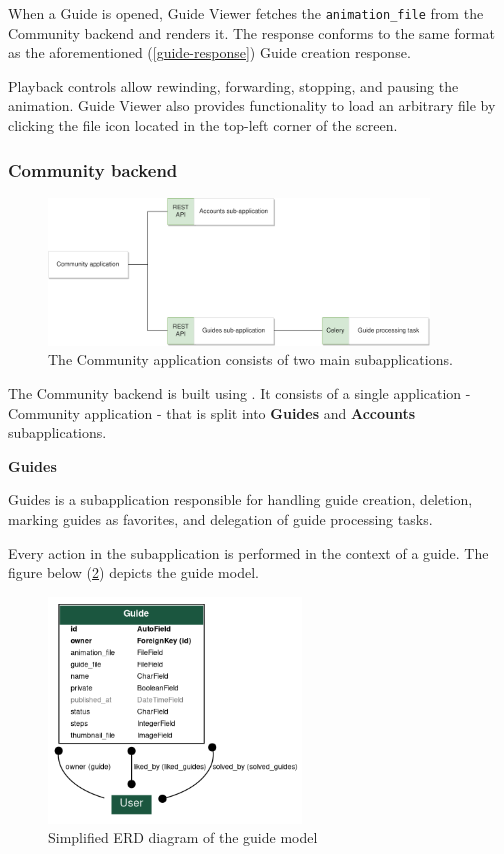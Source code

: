 When a Guide is opened, Guide Viewer fetches the \texttt{animation\_file} from the Community backend and renders it.
The response conforms to the same format as the aforementioned (\ref{guide-response}) Guide creation response.

\medskip
Playback controls allow rewinding, forwarding, stopping, and pausing the animation. Guide Viewer also provides functionality to load an arbitrary  file by clicking the file icon located in the top-left corner of the screen.


\subsubsection{Community backend}

\begin{figure}[hb]
  \caption{The Community application consists of two main subapplications.}
  \label{3-backend-community-components}
  \centering
    \includegraphics[width=0.9\textwidth]{assets/3-community-application.png}
\end{figure}

The Community backend is built using . It consists of a single application - Community application - that is split into \textbf{Guides} and \textbf{Accounts} subapplications.

\medskip

\textbf{Guides}

Guides is a subapplication responsible for handling guide creation, deletion, marking guides as favorites, and delegation of guide processing tasks.

\medskip

Every action in the subapplication is performed in the context of a guide. The figure below (\ref{model--guide}) depicts the guide model.

\begin{figure}[H]
  \caption{\label{model--guide}Simplified ERD diagram of the guide model}
    \centering
    \includegraphics[width=0.6\textwidth]{assets/3-erd-guides.png}
\end{figure}

